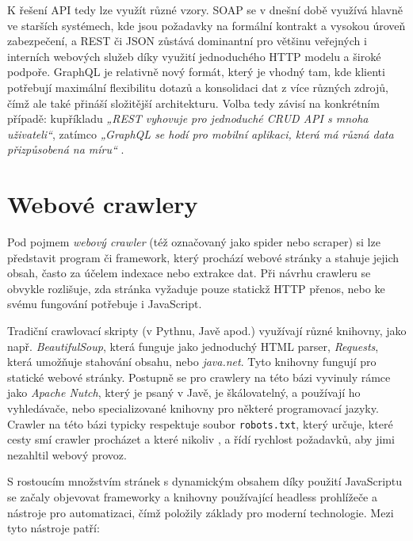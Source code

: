 K řešení API tedy lze využít různé vzory. SOAP se v dnešní době využívá
hlavně ve starších systémech, kde jsou požadavky na formální kontrakt
a vysokou úroveň zabezpečení, a REST či JSON zůstává dominantní pro většinu
veřejných i interních webových služeb díky využití jednoduchého HTTP modelu
a široké podpoře. GraphQL je relativně nový formát, který je vhodný tam,
kde klienti potřebují maximální flexibilitu dotazů a konsolidaci dat
z více různých zdrojů, čímž ale také přináší složitější architekturu. Volba
tedy závisí na konkrétním případě: kupříkladu \emph{„REST vyhovuje
pro jednoduché CRUD API s mnoha uživateli“}, zatímco \emph{„GraphQL se hodí
pro mobilní aplikaci, která má různá data přizpůsobená na míru“}
\cite{YHVfLHsNlUItkF6G,Sj7FFY7SXnJ6m41T}. %

\section{Webové crawlery}
\label{sec:research-crawlers}

Pod pojmem \emph{webový crawler} (též označovaný jako spider nebo scraper)
si lze představit program či framework, který prochází webové stránky
a stahuje jejich obsah, často za účelem indexace nebo extrakce dat.
Při návrhu crawleru se obvykle rozlišuje, zda stránka vyžaduje pouze
statickž HTTP přenos, nebo ke svému fungování potřebuje i JavaScript.

Tradiční crawlovací skripty (v Pythnu, Javě apod.) využívají různé knihovny,
jako např. \emph{BeautifulSoup}, která funguje jako jednoduchý HTML parser,
\emph{Requests}, která umožňuje stahování obsahu, nebo \emph{java.net}. Tyto
knihovny fungují pro statické webové stránky. Postupně se pro crawlery
na této bázi vyvinuly rámce jako \emph{Apache Nutch}, který je psaný v Javě,
je škálovatelný, a používají ho vyhledávače, nebo specializované knihovny
pro některé programovací jazyky. Crawler na této bázi typicky respektuje
soubor \texttt{robots.txt}, který určuje, které cesty smí crawler procházet
a které nikoliv \cite{YHVfLHsNlUItkF6G,adi8S69Mmo0Mi7FC}, %
a řídí rychlost požadavků, aby jimi nezahltil webový provoz.

S rostoucím množstvím stránek s dynamickým obsahem díky použití JavaScriptu
se začaly objevovat frameworky a knihovny používající headless prohlížeče
a nástroje pro automatizaci, čímž položily základy pro moderní technologie.
Mezi tyto nástroje patří:

